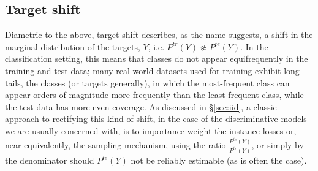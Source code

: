 \subsection{Target shift}\label{ssec:label-shift}
Diametric to the above, target shift describes, as the name suggests, a shift in the marginal
distribution of the targets, \(Y\), i.e. \( P^{tr}(Y) \not\approx P^{te}(Y) \).
%
In the classification setting, this means that classes do not appear equifrequently in the training
and test data; many real-world datasets used for training exhibit long tails, \wrt{} the classes
(or targets generally), in which the most-frequent class can appear orders-of-magnitude more
frequently than the least-frequent class, while the test data has more even coverage.
%
As discussed in \S\ref{sec:iid}, a classic approach to rectifying this kind of shift, in the case
of the discriminative models we are usually concerned with, is to  importance-weight the instance
losses or, near-equivalently, the sampling mechanism, using the ratio \(\frac{P^{te}(Y)}{P^{tr}(Y)}
\), or simply by the denominator should \( P^{te}(Y)\) not be reliably estimable (as is often the
case).
%
%
